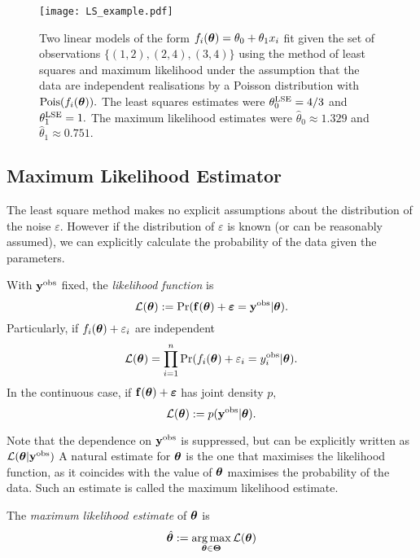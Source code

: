 \begin{figure}[htbp]
    \centering
    \texttt{[image: LS\_example.pdf]}
    \caption{
        Two linear models of the form
        $f_i(\bm{\theta}) = \theta_0 + \theta_1x_i$ fit given the set
        of observations $\{(1, 2), (2, 4), (3, 4)\}$ using the method of
        least squares and maximum likelihood under
        the assumption that the data are independent realisations by a Poisson
        distribution with $\operatorname{Pois}(f_i(\bm{\theta})).$ The least squares estimates
        were $\theta^{\mathrm{LSE}}_0 = 4/3$ and $\theta^{\mathrm{LSE}}_1 = 1.$ The maximum likelihood
        estimates were $\hat{\theta}_0 \approx 1.329$ and
        $\hat{\theta}_1 \approx 0.751.$
    }
    \label{fig:LSE}
\end{figure}

\subsection*{Maximum Likelihood Estimator}

The least square method makes no explicit assumptions about the distribution
of the noise $\varepsilon.$ However if the distribution of $\varepsilon$ is
known (or can be reasonably assumed), we can
explicitly calculate the probability of the data given the parameters.

\begin{definition}
    With $\mathbf{y}^{\mathrm{obs}}$ fixed, the \emph{likelihood function} is
    $$
        \mathcal{L}(\bm{\theta})
        := \Pr(
        \mathbf{f}(\bm{\theta}) + \bm{\varepsilon} = \mathbf{y}^{\mathrm{obs}}
        | \bm{\theta}
        ).
    $$
    Particularly, if $f_i(\bm{\theta}) + \varepsilon_i$ are independent
    $$
        \mathcal{L}(\bm{\theta})
        = \prod_{i = 1}^n
        \Pr(
        f_i(\bm{\theta}) + \varepsilon_i = y_i^{\mathrm{obs}}
        | \bm{\theta}
        ).
    $$
    In the continuous case, if $\mathbf{f}(\bm{\theta}) + \bm{\varepsilon}$
    has joint density $p,$
    $$
        \mathcal{L}(\bm{\theta})
        := p(\mathbf{y}^{\mathrm{obs}} | \bm{\theta}).
    $$
\end{definition}

Note that the dependence on $\mathbf{y}^{\mathrm{obs}}$ is suppressed, but can be
explicitly written as $\mathcal{L}(\bm{\theta}|\mathbf{y}^{\mathrm{obs}})$
A natural estimate for $\bm{\theta}$ is the one that maximises the likelihood
function, as it coincides with the value of $\bm{\theta}$ maximises the
probability of the data. Such an estimate is called the maximum likelihood
estimate.

\begin{definition}
    The \emph{maximum likelihood estimate} of $\bm{\theta}$ is
    $$
        \hat{\bm{\theta}}
        := \operatorname*{arg\,max}_{\bm{\theta}\in\mathbf{\Theta}} \mathcal{L}(\bm{\theta})
    $$
\end{definition}

